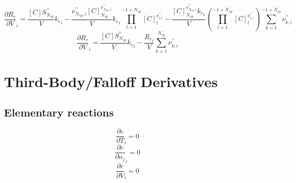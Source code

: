 \documentclass[a4paper,10pt]{article}
\newcommand{\ns}{N_{sp}}
\begin{document}
\begin{dmath} \frac{\partial {R_r} }{\partial V }_{i} = \frac{[C] S^{\prime\prime}_{\ns}}{V} {k_r}_{i} - \frac{\nu^{\prime\prime}_{\ns,i} [C]_{\ns}^{\nu^{\prime\prime}_{\ns,i}}}{V} {k_r}_{i} \prod_{l=1}^{-1 + \ns} [C]_{l}^{\nu^{\prime\prime}_{l,i}} - \frac{[C]_{\ns}^{\nu^{\prime\prime}_{\ns,i}} {k_r}_{i}}{V} \left(\prod_{l=1}^{-1 + \ns} [C]_{l}^{\nu^{\prime\prime}_{l,i}}\right) \sum_{k=1}^{-1 + \ns} \nu^{\prime\prime}_{k,i}\end{dmath} 
\begin{dmath} \frac{\partial {R_r} }{\partial V }_{i} = \frac{[C] S^{\prime\prime}_{\ns}}{V} {k_r}_{i} - \frac{{R_r}_{i}}{V} \sum_{k=1}^{\ns} \nu^{\prime\prime}_{k,i}\end{dmath} 
\section{Third-Body\slash Falloff Derivatives}
\subsection{Elementary reactions
}
\begin{dmath} \frac{\partial c }{\partial T }_{i} = 0\end{dmath} 
\begin{dmath} \frac{\partial c }{\partial {n_j} }_{i} = 0\end{dmath} 
\begin{dmath} \frac{\partial c }{\partial V }_{i} = 0\end{dmath} 
\end{document}
